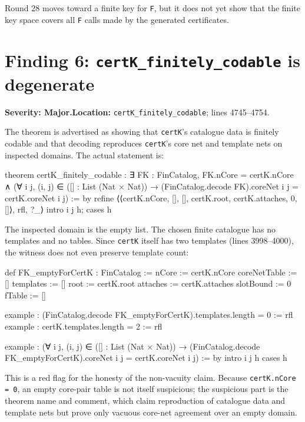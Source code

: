 \documentclass[11pt]{article}
\newcommand{\sev}[1]{\textbf{Severity: #1}}
\begin{document}
Round 28 moves toward a finite key for \texttt{F}, but it does not yet show that the finite key space covers all \texttt{F} calls made by the generated certificates.

\section{Finding 6: \texttt{certK\_finitely\_codable} is degenerate}

\sev{Major.}\quad \textbf{Location:} \texttt{certK\_finitely\_codable}; lines 4745--4754.

The theorem is advertised as showing that \texttt{certK}'s catalogue data is finitely codable and that decoding reproduces \texttt{certK}'s core net and template nets on inspected domains. The actual statement is:

\begin{leancode}
theorem certK_finitely_codable :
    ∃ FK : FinCatalog,
      FK.nCore = certK.nCore ∧
      (∀ i j, (i, j) ∈ ([] : List (Nat × Nat)) →
        (FinCatalog.decode FK).coreNet i j = certK.coreNet i j) := by
  refine ⟨⟨certK.nCore, [], [], certK.root, certK.attaches, 0, []⟩, rfl, ?_⟩
  intro i j h; cases h
\end{leancode}

The inspected domain is the empty list. The chosen finite catalogue has no templates and no tables. Since \texttt{certK} itself has two templates (lines 3998--4000), the witness does not even preserve template count:

\begin{leancode}
def FK_emptyForCertK : FinCatalog :=
  { nCore := certK.nCore
    coreNetTable := []
    templates := []
    root := certK.root
    attaches := certK.attaches
    slotBound := 0
    fTable := [] }

example : (FinCatalog.decode FK_emptyForCertK).templates.length = 0 := rfl
example : certK.templates.length = 2 := rfl

example :
    (∀ i j, (i, j) ∈ ([] : List (Nat × Nat)) →
      (FinCatalog.decode FK_emptyForCertK).coreNet i j = certK.coreNet i j) := by
  intro i j h
  cases h
\end{leancode}

This is a red flag for the honesty of the non-vacuity claim. Because \texttt{certK.nCore = 0}, an empty core-pair table is not itself suspicious; the suspicious part is the theorem name and comment, which claim reproduction of catalogue data and template nets but prove only vacuous core-net agreement over an empty domain.
\end{document}
